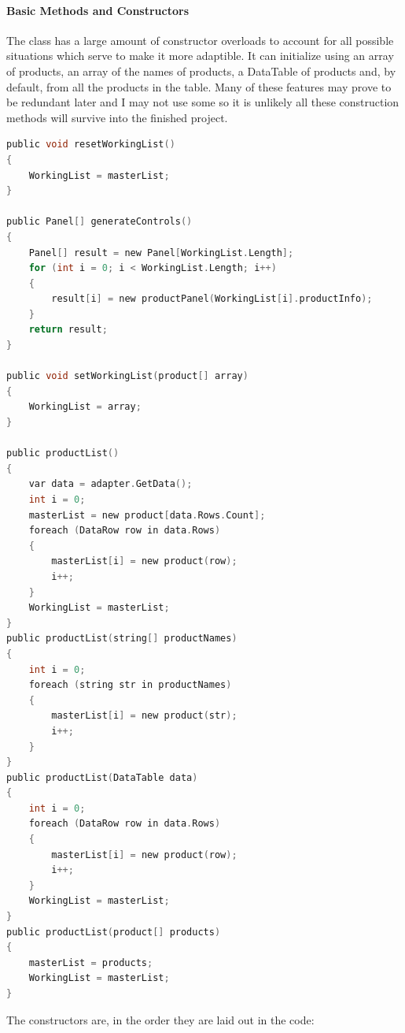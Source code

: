 ﻿\documentclass{article}
\begin{document}
    \paragraph{Basic Methods and Constructors}
    The class has a large amount of constructor overloads to account for all possible situations which serve to make it more adaptible.
    It can initialize using an array of products, an array of the names of products, a DataTable of products and, by default, from all the products in the table.
    Many of these features may prove to be redundant later and I may not use some so it is unlikely all these construction methods will survive into the finished project.
    \begin{lstlisting}[language=C]
public void resetWorkingList()
{
    WorkingList = masterList;
}

public Panel[] generateControls()
{
    Panel[] result = new Panel[WorkingList.Length];
    for (int i = 0; i < WorkingList.Length; i++)
    {
        result[i] = new productPanel(WorkingList[i].productInfo);
    }
    return result;
}

public void setWorkingList(product[] array)
{
    WorkingList = array;
}

public productList()
{
    var data = adapter.GetData();
    int i = 0;
    masterList = new product[data.Rows.Count];
    foreach (DataRow row in data.Rows)
    {
        masterList[i] = new product(row);
        i++;
    }
    WorkingList = masterList;
}
public productList(string[] productNames)
{
    int i = 0;
    foreach (string str in productNames)
    {
        masterList[i] = new product(str);
        i++;
    }
}
public productList(DataTable data)
{
    int i = 0;
    foreach (DataRow row in data.Rows)
    {
        masterList[i] = new product(row);
        i++;
    }
    WorkingList = masterList;
}
public productList(product[] products)
{
    masterList = products;
    WorkingList = masterList;
}
    \end{lstlisting}
    The constructors are, in the order they are laid out in the code:
\end{document}
